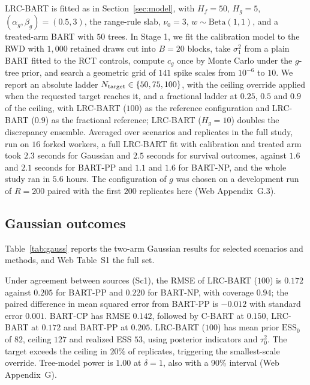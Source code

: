 LRC-BART is fitted as in Section~\ref{sec:model}, with $H_f=50$, $H_g=5$, $(\alpha_g,\beta_g)=(0.5,3)$, the range-rule slab, $\nu_0=3$, $w\sim\mathrm{Beta}(1,1)$, and a treated-arm BART with $50$ trees. In Stage 1, we fit the calibration model to the RWD with $1{,}000$ retained draws cut into $B=20$ blocks, take $\sigma_1^2$ from a plain BART fitted to the RCT controls, compute $c_g$ once by Monte Carlo under the $g$-tree prior, and search a geometric grid of $141$ spike scales from $10^{-6}$ to $10$. We report an absolute ladder $N_{\rm target}\in\{50,75,100\}$, with the ceiling override applied when the requested target reaches it, and a fractional ladder at $0.25$, $0.5$ and $0.9$ of the ceiling, with LRC-BART ($100$) as the reference configuration and LRC-BART ($0.9$) as the fractional reference; LRC-BART ($H_g=10$) doubles the discrepancy ensemble. Averaged over scenarios and replicates in the full study, run on $16$ forked workers, a full LRC-BART fit with calibration and treated arm took $2.3$ seconds for Gaussian and $2.5$ seconds for survival outcomes, against $1.6$ and $2.1$ seconds for BART-PP and $1.1$ and $1.6$ for BART-NP, and the whole study ran in $5.6$ hours. The configuration of $g$ was chosen on a development run of $R=200$ paired with the first $200$ replicates here (Web Appendix~G.3).

\subsection{Gaussian outcomes}
\label{sec:sim_gauss}

Table~\ref{tab:gauss} reports the two-arm Gaussian results for selected scenarios and methods, and Web Table~S1 the full set.

Under agreement between sources (Sc1), the RMSE of LRC-BART ($100$) is $0.172$ against $0.205$ for BART-PP and $0.220$ for BART-NP, with coverage $0.94$; the paired difference in mean squared error from BART-PP is $-0.012$ with standard error $0.001$. BART-CP has RMSE $0.142$, followed by C-BART at $0.150$, LRC-BART at $0.172$ and BART-PP at $0.205$. LRC-BART ($100$) has mean prior $\mathrm{ESS}_0$ of $82$, ceiling $127$ and realized ESS $53$, using posterior indicators and $\tau_0^2$. The target exceeds the ceiling in $20\%$ of replicates, triggering the smallest-scale override. Tree-model power is $1.00$ at $\delta=1$, also with a 90\% interval (Web Appendix~G).

